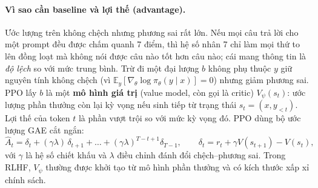 \paragraph{Vì sao cần baseline và lợi thế (advantage).}
Ước lượng trên không chệch nhưng phương sai rất lớn. Nếu mọi câu trả lời cho một prompt đều được chấm quanh 7 điểm, thì hệ số nhân 7 chỉ làm mọi thứ to lên đồng loạt mà không nói được câu nào tốt hơn câu nào; cái mang thông tin là \emph{độ lệch} so với mức trung bình. Trừ đi một đại lượng \( b \) không phụ thuộc \( y \) giữ nguyên tính không chệch (vì \( \mathbb{E}_{y}[\nabla_{\theta} \log \pi_{\theta}(y\mid x)] = 0 \)) nhưng giảm phương sai. PPO lấy \( b \) là một \textbf{mô hình giá trị} (value model, còn gọi là critic) \( V_{\psi}(s_t) \): ước lượng phần thưởng còn lại kỳ vọng nếu sinh tiếp từ trạng thái \( s_t = (x, y_{<t}) \). Lợi thế của token \( t \) là phần vượt trội so với mức kỳ vọng đó. PPO \cite{schulman2017proximal} dùng bộ ước lượng GAE \cite{schulman2016gae} cắt ngắn:
\[
    \hat{A}_t = \delta_t + (\gamma\lambda)\,\delta_{t+1} + \dots + (\gamma\lambda)^{T-t+1}\delta_{T-1},
    \qquad
    \delta_t = r_t + \gamma V(s_{t+1}) - V(s_t),
\]
với \( \gamma \) là hệ số chiết khấu và \( \lambda \) điều chỉnh đánh đổi chệch--phương sai. Trong RLHF, \( V_{\psi} \) thường được khởi tạo từ mô hình phần thưởng và có kích thước xấp xỉ chính sách.


